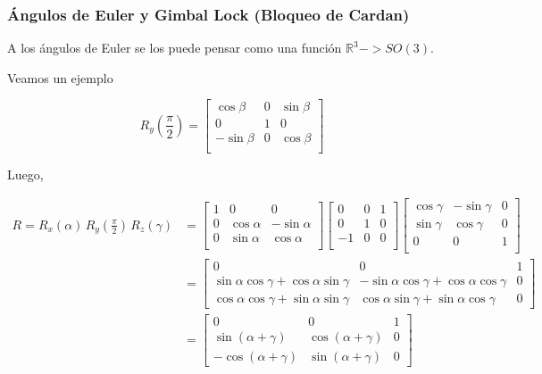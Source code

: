 \begin{frame}
    \frametitle{Ángulos de Euler y Gimbal Lock (Bloqueo de Cardan)}
    \scriptsize
    A los ángulos de Euler se los puede pensar como una función $\mathbb{R}^{3} -> SO(3)$.
    
    Veamos un ejemplo
    
    
    \begin{equation*}
        R_{y}\left(\frac{\pi}{2}\right) = 
        \begin{bmatrix}
            \cos \beta &0&\sin \beta\\
            0 & 1 & 0\\
            -\sin \beta &0&\cos \beta\\
        \end{bmatrix}
    \end{equation*}

    Luego,
   
    \begin{align*}
        R = R_{x}(\alpha) \, R_{y}\left(\frac{\pi}{2}\right) \, R_{z}(\gamma) &=
        \begin{bmatrix}
            1 & 0 & 0 \\
            0 & \cos \alpha & -\sin \alpha \\
            0& \sin \alpha & \cos \alpha \\
        \end{bmatrix}
        \begin{bmatrix}
                0 & 0 & 1\\
                0 & 1 & 0\\
                -1 & 0 & 0\\
        \end{bmatrix}
        \begin{bmatrix}
            \cos \gamma & -\sin \gamma & 0\\
            \sin \gamma & \cos \gamma &0\\
            0 & 0 & 1\\
        \end{bmatrix}\\
        &=
        \begin{bmatrix}
            0 & 0 & 1\\
            \sin \alpha \cos \gamma + \cos \alpha \sin \gamma& -\sin \alpha \cos \gamma + \cos \alpha \cos \gamma& 0\\
            \cos \alpha \cos \gamma + \sin \alpha \sin \gamma & \cos \alpha \sin \gamma + \sin \alpha \cos \gamma & 0
        \end{bmatrix}\\
        &=
        \begin{bmatrix}
            0 & 0 & 1\\
            \sin(\alpha + \gamma) & \cos(\alpha + \gamma) & 0\\
            -\cos(\alpha + \gamma) & \sin(\alpha + \gamma)& 0
        \end{bmatrix}
    \end{align*}
    

\end{frame}
